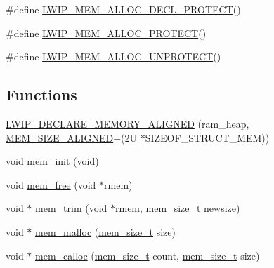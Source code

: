 \begin{DoxyCompactItemize}
\item 
\#define \hyperlink{openmote-cc2538_2lwip_2src_2core_2mem_8c_a016a07ea84e1d75386765b90015b6698}{L\+W\+I\+P\+\_\+\+M\+E\+M\+\_\+\+A\+L\+L\+O\+C\+\_\+\+D\+E\+C\+L\+\_\+\+P\+R\+O\+T\+E\+CT}()
\item 
\#define \hyperlink{openmote-cc2538_2lwip_2src_2core_2mem_8c_a3c644ac3ac94ed977bb165eeb6ff741a}{L\+W\+I\+P\+\_\+\+M\+E\+M\+\_\+\+A\+L\+L\+O\+C\+\_\+\+P\+R\+O\+T\+E\+CT}()
\item 
\#define \hyperlink{openmote-cc2538_2lwip_2src_2core_2mem_8c_af0643ce3aa197952517914e1d644150a}{L\+W\+I\+P\+\_\+\+M\+E\+M\+\_\+\+A\+L\+L\+O\+C\+\_\+\+U\+N\+P\+R\+O\+T\+E\+CT}()
\end{DoxyCompactItemize}
\subsection*{Functions}
\begin{DoxyCompactItemize}
\item 
\hyperlink{openmote-cc2538_2lwip_2src_2core_2mem_8c_a4efff8c25f955c6a771793812bfc0cf4}{L\+W\+I\+P\+\_\+\+D\+E\+C\+L\+A\+R\+E\+\_\+\+M\+E\+M\+O\+R\+Y\+\_\+\+A\+L\+I\+G\+N\+ED} (ram\+\_\+heap, \hyperlink{openmote-cc2538_2lwip_2src_2core_2mem_8c_a78ed2097d5d3e2ca4599b2ca3d91493a}{M\+E\+M\+\_\+\+S\+I\+Z\+E\+\_\+\+A\+L\+I\+G\+N\+ED}+(2\+U $\ast$\+S\+I\+Z\+E\+O\+F\+\_\+\+S\+T\+R\+U\+C\+T\+\_\+\+M\+E\+M))
\item 
void \hyperlink{openmote-cc2538_2lwip_2src_2core_2mem_8c_a44a136e3b70c36abb6f8dc060c778113}{mem\+\_\+init} (void)
\item 
void \hyperlink{openmote-cc2538_2lwip_2src_2core_2mem_8c_a65169147c44e9db60d997819af9b455c}{mem\+\_\+free} (void $\ast$rmem)
\item 
void $\ast$ \hyperlink{openmote-cc2538_2lwip_2src_2core_2mem_8c_a2f0214c1c0d4acf856fb3ec76818a5a9}{mem\+\_\+trim} (void $\ast$rmem, \hyperlink{native_2lwip_2src_2include_2lwip_2mem_8h_a49bff6e5dd4cb95fe6dc0670962bbf54}{mem\+\_\+size\+\_\+t} newsize)
\item 
void $\ast$ \hyperlink{openmote-cc2538_2lwip_2src_2core_2mem_8c_a932aa40d85b14cb7331625e012d12335}{mem\+\_\+malloc} (\hyperlink{native_2lwip_2src_2include_2lwip_2mem_8h_a49bff6e5dd4cb95fe6dc0670962bbf54}{mem\+\_\+size\+\_\+t} size)
\item 
void $\ast$ \hyperlink{openmote-cc2538_2lwip_2src_2core_2mem_8c_ab0bdc525971701883f2065e7fb257a24}{mem\+\_\+calloc} (\hyperlink{native_2lwip_2src_2include_2lwip_2mem_8h_a49bff6e5dd4cb95fe6dc0670962bbf54}{mem\+\_\+size\+\_\+t} count, \hyperlink{native_2lwip_2src_2include_2lwip_2mem_8h_a49bff6e5dd4cb95fe6dc0670962bbf54}{mem\+\_\+size\+\_\+t} size)
\end{DoxyCompactItemize}


